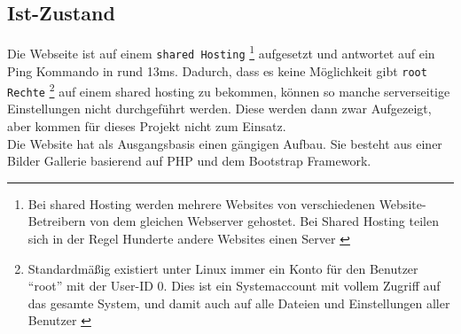 	\subsection{Ist-Zustand} %
	\label{sub:ist_zustand}
		Die Webseite ist auf einem \texttt{shared Hosting}
		\footnote{Bei shared Hosting werden mehrere Websites von verschiedenen Website-Betreibern von dem gleichen Webserver gehostet. Bei Shared Hosting teilen sich in der Regel Hunderte andere Websites einen Server \autocite{itWissen}} 
		aufgesetzt und antwortet auf ein Ping Kommando in rund 13ms. Dadurch, dass es keine Möglichkeit gibt \texttt{root Rechte} \footnote{Standardmäßig existiert unter Linux immer ein Konto für den Benutzer "`root"' mit der User-ID 0. Dies ist ein Systemaccount mit vollem Zugriff auf das gesamte System, und damit auch auf alle Dateien und Einstellungen aller Benutzer \autocite{ubuntu14}} auf einem shared hosting zu bekommen, können so manche serverseitige Einstellungen nicht durchgeführt werden. Diese werden dann zwar Aufgezeigt, aber kommen für dieses Projekt nicht zum Einsatz.\\
		Die Website hat als Ausgangsbasis einen gängigen Aufbau. Sie besteht aus einer Bilder Gallerie basierend auf PHP und dem Bootstrap Framework.
		
